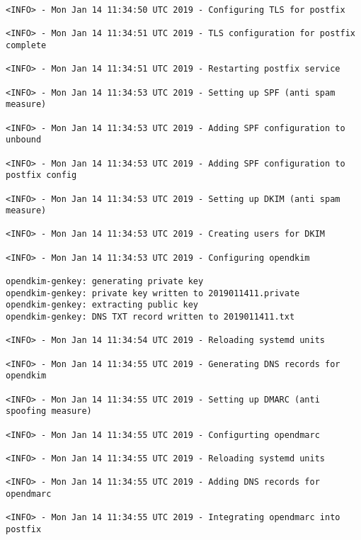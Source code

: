 \begin{lstlisting}[escapeinside=||]
<INFO> - Mon Jan 14 11:34:50 UTC 2019 - Configuring TLS for postfix
                                                                                                                                                                                                                                                                                                                                              
<INFO> - Mon Jan 14 11:34:51 UTC 2019 - TLS configuration for postfix complete

<INFO> - Mon Jan 14 11:34:51 UTC 2019 - Restarting postfix service

<INFO> - Mon Jan 14 11:34:53 UTC 2019 - Setting up SPF (anti spam measure)

<INFO> - Mon Jan 14 11:34:53 UTC 2019 - Adding SPF configuration to unbound

<INFO> - Mon Jan 14 11:34:53 UTC 2019 - Adding SPF configuration to postfix config

<INFO> - Mon Jan 14 11:34:53 UTC 2019 - Setting up DKIM (anti spam measure)

<INFO> - Mon Jan 14 11:34:53 UTC 2019 - Creating users for DKIM

<INFO> - Mon Jan 14 11:34:53 UTC 2019 - Configuring opendkim

opendkim-genkey: generating private key
opendkim-genkey: private key written to 2019011411.private
opendkim-genkey: extracting public key
opendkim-genkey: DNS TXT record written to 2019011411.txt

<INFO> - Mon Jan 14 11:34:54 UTC 2019 - Reloading systemd units

<INFO> - Mon Jan 14 11:34:55 UTC 2019 - Generating DNS records for opendkim

<INFO> - Mon Jan 14 11:34:55 UTC 2019 - Setting up DMARC (anti spoofing measure)

<INFO> - Mon Jan 14 11:34:55 UTC 2019 - Configurting opendmarc

<INFO> - Mon Jan 14 11:34:55 UTC 2019 - Reloading systemd units

<INFO> - Mon Jan 14 11:34:55 UTC 2019 - Adding DNS records for opendmarc

<INFO> - Mon Jan 14 11:34:55 UTC 2019 - Integrating opendmarc into postfix
\end{lstlisting}
 
